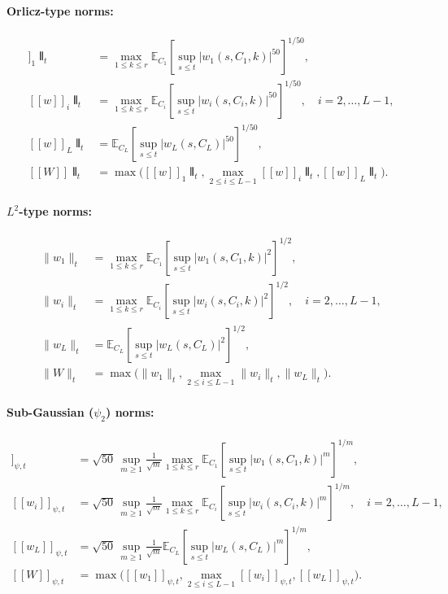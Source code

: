\documentclass[11pt]{article}
\newcommand{\E}{\mathbb{E}}
\newcommand{\1}{\mathbbm{1}}
\newcommand{\llbracket}{[\![}
\newcommand{\rrbracket}{]\!]}
\newcommand{\interleave}[1]{\llbracket #1 \rrbracket}
\begin{document}
\paragraph*{Orlicz-type norms:}
\begin{align}
\interleave w_1\interleave_t &= \max_{1\le k\le r}\E_{C_1}\!\left[\sup_{s\le t}|w_1(s,C_1,k)|^{50}\right]^{1/50},\label{eq:norm-w1}\\
\interleave w_i\interleave_t &= \max_{1\le k\le r}\E_{C_i}\!\left[\sup_{s\le t}|w_i(s,C_i,k)|^{50}\right]^{1/50}, \quad i=2,\ldots,L-1,\label{eq:norm-wi}\\
\interleave w_L\interleave_t &= \E_{C_L}\!\left[\sup_{s\le t}|w_L(s,C_L)|^{50}\right]^{1/50},\label{eq:norm-wL}\\
\interleave W\interleave_t &= \max\big(\interleave w_1\interleave_t, \max_{2\le i\le L-1}\interleave w_i\interleave_t, \interleave w_L\interleave_t\big).\label{eq:norm-W}
\end{align}

\paragraph*{$L^2$-type norms:}
\begin{align}
\|w_1\|_t &= \max_{1\le k\le r}\E_{C_1}\!\left[\sup_{s\le t}|w_1(s,C_1,k)|^2\right]^{1/2},\\
\|w_i\|_t &= \max_{1\le k\le r}\E_{C_i}\!\left[\sup_{s\le t}|w_i(s,C_i,k)|^2\right]^{1/2}, \quad i=2,\ldots,L-1,\\
\|w_L\|_t &= \E_{C_L}\!\left[\sup_{s\le t}|w_L(s,C_L)|^2\right]^{1/2},\\
\|W\|_t &= \max\big(\|w_1\|_t, \max_{2\le i\le L-1}\|w_i\|_t, \|w_L\|_t\big).
\end{align}

\paragraph*{Sub-Gaussian ($\psi_2$) norms:}
\begin{align}
\llbracket w_1\rrbracket_{\psi,t} &= \sqrt{50}\,\sup_{m\ge 1}\frac{1}{\sqrt{m}}\max_{1\le k\le r}\E_{C_1}\!\left[\sup_{s\le t}|w_1(s,C_1,k)|^m\right]^{1/m},\\
\llbracket w_i\rrbracket_{\psi,t} &= \sqrt{50}\,\sup_{m\ge 1}\frac{1}{\sqrt{m}}\max_{1\le k\le r}\E_{C_i}\!\left[\sup_{s\le t}|w_i(s,C_i,k)|^m\right]^{1/m}, \quad i=2,\ldots,L-1,\\
\llbracket w_L\rrbracket_{\psi,t} &= \sqrt{50}\,\sup_{m\ge 1}\frac{1}{\sqrt{m}}\E_{C_L}\!\left[\sup_{s\le t}|w_L(s,C_L)|^m\right]^{1/m},\\
\llbracket W\rrbracket_{\psi,t} &= \max\big(\llbracket w_1\rrbracket_{\psi,t}, \max_{2\le i\le L-1}\llbracket w_i\rrbracket_{\psi,t}, \llbracket w_L\rrbracket_{\psi,t}\big).
\end{align}
\end{document}
